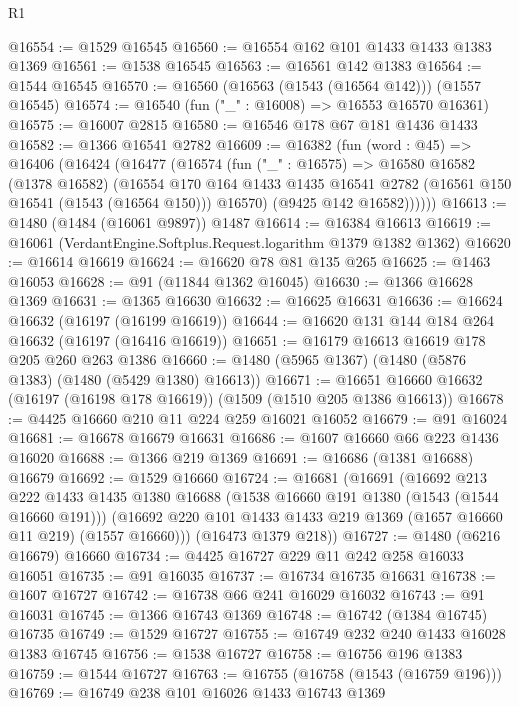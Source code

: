 \begin{lexlean}{R1}
\begin{coremodule}
@16554 := @1529 @16545
@16560 := @16554 @162 @101 @1433 @1433 @1383 @1369
@16561 := @1538 @16545
@16563 := @16561 @142 @1383
@16564 := @1544 @16545
@16570 := @16560 (@16563 (@1543 (@16564 @142))) (@1557 @16545)
@16574 := @16540 (fun ("_" : @16008) => @16553 @16570 @16361)
@16575 := @16007 @2815
@16580 := @16546 @178 @67 @181 @1436 @1433
@16582 := @1366 @16541 @2782
@16609 := @16382
    (fun (word : @45) =>
    @16406
      (@16424
        (@16477
          (@16574
            (fun ("_" : @16575) =>
            @16580
              @16582
              (@1378 @16582)
              (@16554
                @170
                @164
                @1433
                @1435
                @16541
                @2782
                (@16561 @150 @16541 (@1543 (@16564 @150)))
                @16570)
              (@9425 @142 @16582))))))
@16613 := @1480 (@1484 (@16061 @9897)) @1487
@16614 := @16384 @16613
@16619 := @16061 (VerdantEngine.Softplus.Request.logarithm @1379 @1382 @1362)
@16620 := @16614 @16619
@16624 := @16620 @78 @81 @135 @265
@16625 := @1463 @16053
@16628 := @91 (@11844 @1362 @16045)
@16630 := @1366 @16628 @1369
@16631 := @1365 @16630
@16632 := @16625 @16631
@16636 := @16624 @16632 (@16197 (@16199 @16619))
@16644 := @16620 @131 @144 @184 @264 @16632 (@16197 (@16416 @16619))
@16651 := @16179 @16613 @16619 @178 @205 @260 @263 @1386
@16660 := @1480 (@5965 @1367) (@1480 (@5876 @1383) (@1480 (@5429 @1380) @16613))
@16671 := @16651 @16660 @16632 (@16197 (@16198 @178 @16619)) (@1509 (@1510 @205 @1386 @16613))
@16678 := @4425 @16660 @210 @11 @224 @259 @16021 @16052
@16679 := @91 @16024
@16681 := @16678 @16679 @16631
@16686 := @1607 @16660 @66 @223 @1436 @16020
@16688 := @1366 @219 @1369
@16691 := @16686 (@1381 @16688) @16679
@16692 := @1529 @16660
@16724 := @16681
    (@16691
      (@16692
        @213
        @222
        @1433
        @1435
        @1380
        @16688
        (@1538 @16660 @191 @1380 (@1543 (@1544 @16660 @191)))
        (@16692 @220 @101 @1433 @1433 @219 @1369 (@1657 @16660 @11 @219) (@1557 @16660)))
      (@16473 @1379 @218))
@16727 := @1480 (@6216 @16679) @16660
@16734 := @4425 @16727 @229 @11 @242 @258 @16033 @16051
@16735 := @91 @16035
@16737 := @16734 @16735 @16631
@16738 := @1607 @16727
@16742 := @16738 @66 @241 @16029 @16032
@16743 := @91 @16031
@16745 := @1366 @16743 @1369
@16748 := @16742 (@1384 @16745) @16735
@16749 := @1529 @16727
@16755 := @16749 @232 @240 @1433 @16028 @1383 @16745
@16756 := @1538 @16727
@16758 := @16756 @196 @1383
@16759 := @1544 @16727
@16763 := @16755 (@16758 (@1543 (@16759 @196)))
@16769 := @16749 @238 @101 @16026 @1433 @16743 @1369

\end{coremodule}
\end{lexlean}
